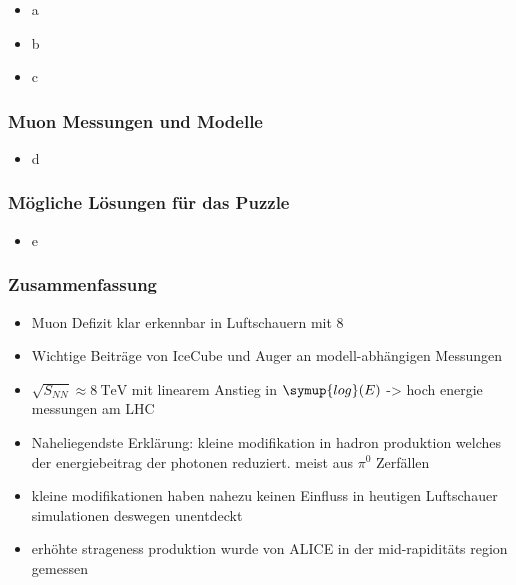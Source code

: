 \documentclass[aspectratio=1610, 9pt]{beamer}
\begin{document}
\begin{frame}\frametitle{}
  \begin{itemize}
    \item a
    \item b
    \item c
  \end{itemize}
\end{frame}

\begin{frame}\frametitle{Muon Messungen und Modelle}
  \begin{itemize}
    \item d
  \end{itemize}
\end{frame}

\begin{frame}\frametitle{M\"ogliche L\"osungen f\"ur das Puzzle}
  \begin{itemize}
    \item e
  \end{itemize}
\end{frame}


\begin{frame}\frametitle{Zusammenfassung}
  \begin{itemize}
    \item Muon Defizit klar erkennbar in Luftschauern mit 8\sigma
    \item Wichtige Beitr\"age von IceCube und Auger an modell-abh\"angigen Messungen
    \item $\sqrt{S_{NN}} \approx \SI{8}{\tera\electronvolt}$ mit linearem Anstieg in $\symup{log}(E)$ -> hoch energie messungen am LHC
    \item Naheliegendste Erkl\"arung: kleine modifikation in hadron produktion welches der energiebeitrag der photonen reduziert. meist aus $\pi^{0}$ Zerf\"allen
    \item kleine modifikationen haben nahezu keinen Einfluss in heutigen Luftschauer simulationen deswegen unentdeckt
    \item erh\"ohte strageness produktion wurde von ALICE in der mid-rapidit\"ats region gemessen
  \end{itemize}
\end{frame}
\end{document}
